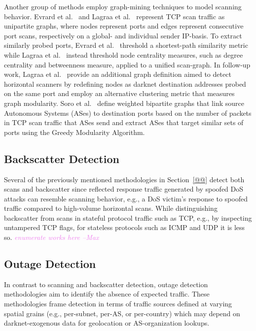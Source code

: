 \documentclass[manuscript,nonacm]{acmart}
\newcommand{\maxnote}[1]{\textit{\textcolor{violet}{#1 --Max}}}
\begin{document}
\vspace{0.25em}
\noindent{\textbf{}}
Another group of methods employ graph-mining techniques to model scanning behavior.
Evrard et al.~\cite{2019evrard} and Lagraa et al.~\cite{2017lagraa,2019lagraa} represent TCP scan traffic as unipartite graphs, where nodes represent ports and edges represent consecutive port scans, respectively on a global- and individual sender IP-basis. 
To extract similarly probed ports, Evrard et al.~\cite{2019evrard} threshold a shortest-path similarity metric while Lagraa et al.~\cite{2017lagraa} instead threshold node centrality measures, such as degree centrality and betweenness measure, applied to a unified scan-graph.
In follow-up work, Lagraa et al.~\cite{2019lagraa} provide an additional graph definition aimed to detect horizontal scanners by redefining nodes as darknet destination addresses probed on the same port and employ an alternative clustering metric that measures graph modularity.
Soro et al.~\cite{2020soro} define weighted bipartite graphs that link source Autonomous Systems (ASes) to destination ports based on the number of packets in TCP scan traffic that ASes send and extract ASes that target similar sets of ports using the Greedy Modularity Algorithm.


\label{sec:methods:dos}
\subsection{Backscatter Detection}
Several of the previously mentioned methodologies in Section~\ref{@@} detect both scans and backscatter since reflected response traffic generated by spoofed DoS attacks can resemble scanning behavior, e.g., a DoS victim's response to spoofed traffic compared to high-volume horizontal scans.
While distinguishing backscatter from scans in stateful protocol traffic such as TCP, e.g., by inspecting untampered TCP flags, for stateless protocols such as ICMP and UDP it is less so. 
\maxnote{enumerate works here}

\label{sec:methods:outage}
\subsection{Outage Detection}
In contrast to scanning and backscatter detection, outage detection methodologies aim to identify the absence of expected traffic.
These methodologies frame detection in terms of traffic sources defined at varying spatial grains (e.g., per-subnet, per-AS, or per-country) which may depend on darknet-exogenous data for geolocation or AS-organization lookups.
\end{document}
